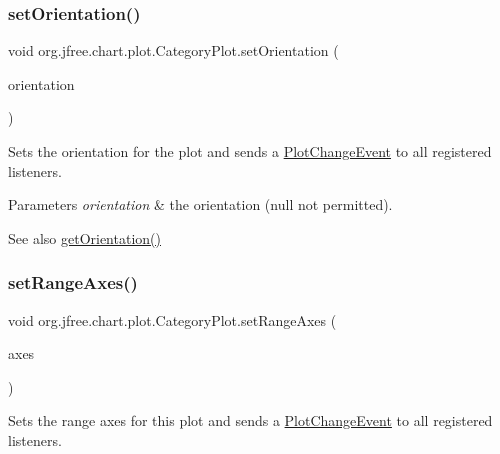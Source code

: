 \subsubsection{\texorpdfstring{set\+Orientation()}{setOrientation()}}
{\footnotesize\ttfamily void org.\+jfree.\+chart.\+plot.\+Category\+Plot.\+set\+Orientation (\begin{DoxyParamCaption}\item[{\mbox{\hyperlink{classorg_1_1jfree_1_1chart_1_1plot_1_1_plot_orientation}{Plot\+Orientation}}}]{orientation }\end{DoxyParamCaption})}

Sets the orientation for the plot and sends a \mbox{\hyperlink{}{Plot\+Change\+Event}} to all registered listeners.


\begin{DoxyParams}{Parameters}
{\em orientation} & the orientation ({\ttfamily null} not permitted).\\
\hline
\end{DoxyParams}
\begin{DoxySeeAlso}{See also}
\mbox{\hyperlink{classorg_1_1jfree_1_1chart_1_1plot_1_1_category_plot_ab765cf8f5fe1dcf554b1a223bbe2d158}{get\+Orientation()}} 
\end{DoxySeeAlso}
\mbox{\label{classorg_1_1jfree_1_1chart_1_1plot_1_1_category_plot_a88e20554a1e8626f073f1c2dd843c8f8}} 
\subsubsection{\texorpdfstring{set\+Range\+Axes()}{setRangeAxes()}}
{\footnotesize\ttfamily void org.\+jfree.\+chart.\+plot.\+Category\+Plot.\+set\+Range\+Axes (\begin{DoxyParamCaption}\item[{\mbox{\hyperlink{classorg_1_1jfree_1_1chart_1_1axis_1_1_value_axis}{Value\+Axis}} \mbox{[}$\,$\mbox{]}}]{axes }\end{DoxyParamCaption})}

Sets the range axes for this plot and sends a \mbox{\hyperlink{}{Plot\+Change\+Event}} to all registered listeners.


